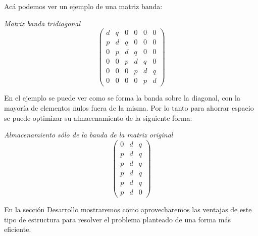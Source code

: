 Acá podemos ver un ejemplo de una matriz banda:

\emph{ Matriz banda tridiagonal } 
\[ \left( \begin{array}{ccccccc}
d & q & 0 & 0 & 0 & 0 \\
p & d & q & 0 & 0 & 0 \\
0 & p & d & q & 0 & 0 \\
0 & 0 & p & d & q & 0 \\
0 & 0 & 0 & p & d & q \\
0 & 0 & 0 & 0 & p & d \end{array} 
\right)\] 

En el ejemplo se puede ver como se forma la banda sobre la diagonal, con la mayoría de elementos nulos fuera de la misma. Por lo tanto para ahorrar espacio se puede optimizar su almacenamiento de la siguiente forma:

\emph{ Almacenamiento sólo de la banda de la matriz original } 
\[ \left( \begin{array}{ccc}
0 & d & q \\
p & d & q \\
p & d & q \\
p & d & q \\
p & d & q \\
p & d & 0 \end{array} 
\right)\] 


En la sección Desarrollo mostraremos como aprovecharemos las ventajas de este tipo de estructura para resolver el problema planteado de una forma más eficiente. 





